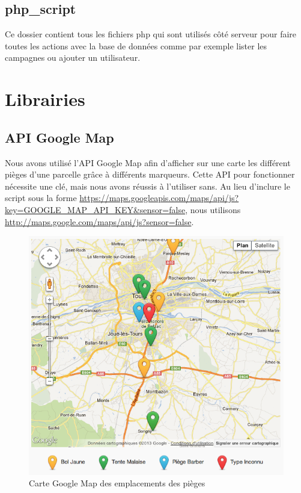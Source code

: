 \documentclass[twoside]{EPURapport}
\begin{document}
		\subsection{php\_script}
		Ce dossier contient tous les fichiers php qui sont utilisés côté serveur pour faire toutes les actions avec la base de données comme par exemple lister les campagnes ou ajouter un utilisateur.
	
	\section{Librairies}
	\label{lib}
		
		\subsection{API Google Map}
		\label{lib:map}
		Nous avons utilisé l'API Google Map afin d'afficher sur une carte les différent pièges d'une parcelle grâce à différents marqueurs. Cette API pour fonctionner nécessite une clé, mais nous avons réussis à l'utiliser sans. Au lieu d'inclure le script sous la forme \url{https://maps.googleapis.com/maps/api/js?key=GOOGLE_MAP_API_KEY&sensor=false}, nous utilisons \url{http://maps.google.com/maps/api/js?sensor=false}.
		
		\begin{figure}[hbtp]
			\centering
			\includegraphics[scale=0.5]{images/lib-API_GoogleMap.png}
			\caption{Carte Google Map des emplacements des pièges}
		\end{figure}
		
\end{document}

